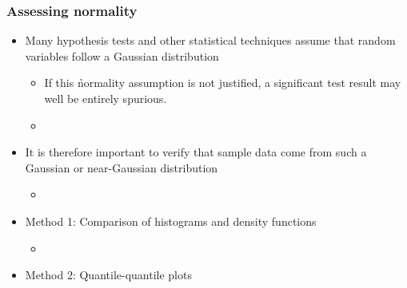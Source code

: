 \documentclass[t]{beamer} %
\begin{document}
\begin{frame}
  \frametitle{Assessing normality}
  
  \begin{itemize}
  \item Many hypothesis tests and other statistical techniques assume that
    random variables follow a Gaussian distribution 
    \begin{itemize}
    \item If this \h{normality assumption} is not justified, a significant
      test result may well be entirely spurious.
    \item[]
    \end{itemize}
  \item It is therefore important to verify that sample data come from such a
    Gaussian or near-Gaussian distribution
    \begin{itemize}
    \item[]
    \end{itemize}
    \pause
  \item Method 1: Comparison of histograms and density functions
    \begin{itemize}
    \item[]
    \end{itemize}
    \pause
  \item Method 2: Quantile-quantile plots
  \end{itemize}
\end{frame}
\end{document}
